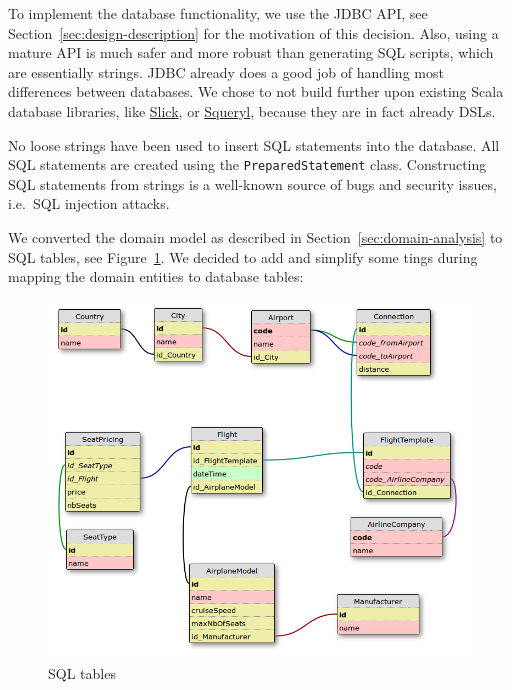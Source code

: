 \documentclass[a4paper]{article}
\newcommand{\cc}[1]{\texttt{#1}}
\begin{document}
To implement the database functionality, we use the JDBC API, see Section~\ref{sec:design-description} for the motivation of this decision.
Also, using a mature API is much safer and more robust than generating SQL scripts, which are essentially strings.
JDBC already does a good job of handling most differences between databases.
We chose to not build further upon existing Scala database libraries, like \href{http://slick.typesafe.com/}{Slick}, or \href{http://squeryl.org/}{Squeryl}, because they are in fact already DSLs.

No loose strings have been used to insert SQL statements into the database.
All SQL statements are created using the \cc{Prepared\-Statement} class.
Constructing SQL statements from strings is a well-known source of bugs and security issues, i.e.\ SQL injection attacks.

We converted the domain model as described in Section~\ref{sec:domain-analysis} to SQL tables, see Figure~\ref{fig:database-tables}.
We decided to add and simplify some tings during mapping the domain entities to database tables:

\begin{figure}[ht!]
  \includegraphics[width=1.0\textwidth]{../analysis/dbtables-diagram.png}
  \caption{SQL tables}\label{fig:database-tables}
\end{figure}
\end{document}
